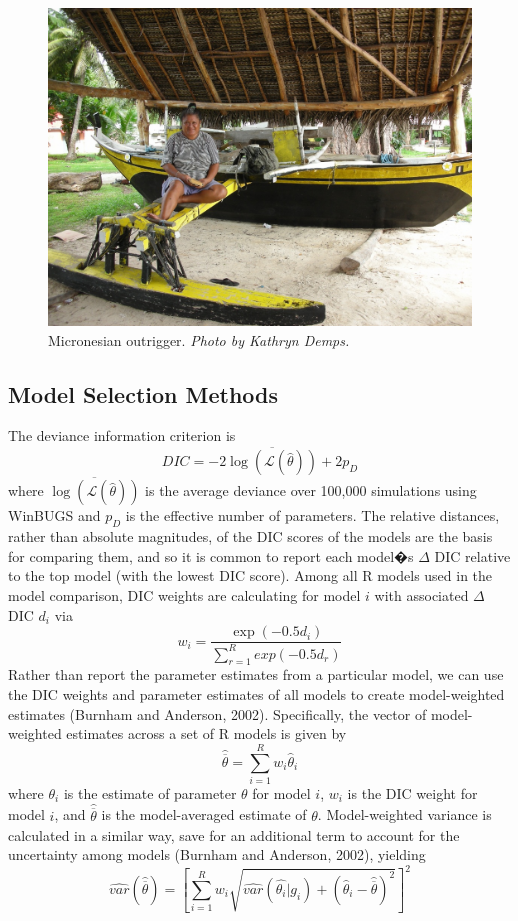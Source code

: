 \begin{figure}[ht]
\begin{center}
\includegraphics[scale=1]{figures/canoes/ESMFigure3.jpg}
\caption{Micronesian outrigger.  \textit{Photo by Kathryn Demps.}}
\end{center}
\end{figure}

\newpage
\subsection{Model Selection Methods}

The deviance information criterion is
 \[ DIC = -2 \overline{\log(\mathcal{L}(\widehat{\theta}))} + 2p_D
\]
where $\overline{\log(\mathcal{L}(\widehat{\theta}))}$ is the average deviance over 100,000 simulations using WinBUGS and $p_D$ is the effective number of parameters.  The relative distances, rather than absolute magnitudes, of the DIC scores of the models are the basis for comparing them, and so it is common to report each model�s $\Delta$ DIC relative to the top model (with the lowest DIC score).  Among all R models used in the model comparison, DIC weights are calculating for model $i$ with associated $\Delta$ DIC $d_i$ via
\[w_i = \frac{\exp(-0.5 d_i)}{\sum_{r=1}^R exp(-0.5 d_r)}
\]
Rather than report the parameter estimates from a particular model, we can use the DIC weights and parameter estimates of all models to create model-weighted estimates (Burnham and Anderson, 2002).  Specifically, the vector of model-weighted estimates across a set of R models is given by
  \[\widehat{\overline{\theta}} = \sum_{i=1}^R w_i \widehat{\theta}_i
\]
where $\theta_i$ is the estimate of parameter $\theta$ for model $i$, $w_i$ is the DIC weight for model $i$, and $\widehat{\overline{\theta}}$ is the model-averaged estimate of $\theta$.  Model-weighted variance is calculated in a similar way, save for an additional term to account for the uncertainty among models (Burnham and Anderson, 2002), yielding
  \[\widehat{var}(\widehat{\overline{\theta}}) = \left[\sum_{i=1}^R w_i \sqrt{\widehat{var}(\widehat{\theta_i}|g_i) + (\widehat{\theta}_i - \widehat{\overline{\theta}})^2}\right]^2
\]

